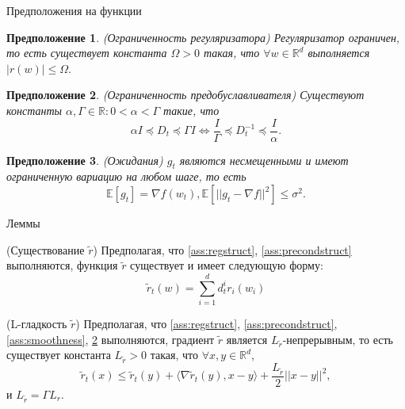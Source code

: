 \documentclass[aspectratio=169, 12pt]{beamer}
\newtheorem{assumption}{Предположение}
\begin{document}
\begin{frame}[shrink]{Предположения на функции}
\begin{assumption}{(Ограниченность регуляризатора)}
\label{ass:regbound}
Регуляризатор ограничен, то есть существует константа $\Omega > 0$ такая, что $\forall w \in \mathbb{R}^d$ выполняется $ |r(w)| \le \Omega.$
\end{assumption}

\begin{assumption}{(Ограниченность предобуславливателя)}
\label{ass:preconditioned}
Существуют константы $\alpha, \Gamma \in \mathbb{R} : 0 < \alpha < \Gamma$ такие, что
\begin{equation*}
\alpha I \preccurlyeq D_t \preccurlyeq \Gamma I \Leftrightarrow \frac{I}{\Gamma} \preccurlyeq D_t^{-1} \preccurlyeq \frac{I}{\alpha}.
\end{equation*}
\end{assumption}

\begin{assumption}{(Ожидания)}
\label{ass:expectations}
$g_t$ являются несмещенными и имеют ограниченную вариацию на любом шаге, то есть
\begin{equation*}
\mathbb{E}\left[ g_t \right] = \nabla f (w_t), \mathbb{E}\left[ ||g_t - \nabla f||^2 \right] \leq \sigma^2.
\end{equation*}
\end{assumption}

\end{frame}

\begin{frame}{Леммы}
    \begin{lemma}
\label{lemma:existence}
{(Существование $\widetilde{r}$)}
    Предполагая, что \ref{ass:regstruct}, \ref{ass:precondstruct} выполняются, функция $\widetilde{r}$ существует и имеет следующую форму:
    $$\widetilde{r}_t(w) = \sum_{i=1}^d d_t^i r_i(w_i)$$
\end{lemma}

\begin{lemma}\label{lemma:tildesmoothness}{(L-гладкость $\widetilde{r}$)}
Предполагая, что \ref{ass:regstruct}, \ref{ass:precondstruct}, \ref{ass:smoothness}, \ref{ass:preconditioned} выполняются,
градиент $\widetilde{r}$ является $L_{\tilde{r}}$-непрерывным, 
то есть существует константа  $L_{\tilde{r}} > 0$ такая, что $\forall x, y \in \mathbb{R}^d$,
\begin{equation*}
    		\widetilde{r}_t(x) \leq \widetilde{r}_t(y) + \langle \nabla \widetilde{r}_t(y), x-y \rangle + \frac{L_{\tilde{r}}}{2} ||x - y||^2,
    	\end{equation*}
     и $L_{\tilde{r}} = \Gamma L_r$.
\end{lemma}


\end{frame}
\end{document}
